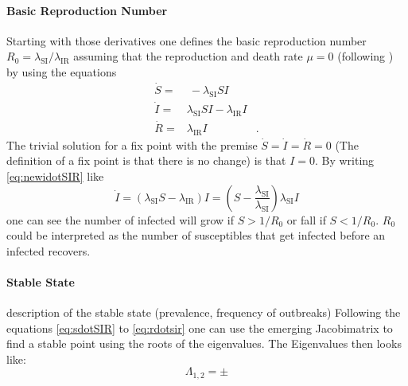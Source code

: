 \paragraph{Basic Reproduction Number}
Starting with those derivatives one defines the basic reproduction number $R_0=\lambda_\text{SI} / \lambda_\text{IR}$ assuming that the reproduction and death rate $\mu=0$ (following \citep{AND92}) by using the equations
\begin{eqnarray}
\dot{S} =& \ -\lambda_\text{SI} SI &  \label{eq:newsdotSIR}\\ 
\dot{I} =& \lambda_\text{SI} SI - \lambda_\text{IR} I  & \label{eq:newidotSIR}\\
\dot{R} =& \lambda_\text{IR} I &.
\end{eqnarray}
The trivial solution for a fix point with the premise $\dot{S} = \dot{I} =\dot{R} = 0$ (The definition of a fix point is that there is no change) is that $I=0$. By writing \ref{eq:newidotSIR} like 
\begin{equation}
\dot{I} = (\lambda_\text{SI} S -\lambda_\text{IR}) I = \left( S-\frac{\lambda_\text{SI}}{\lambda_\text{SI}} \right) \lambda_\text{SI} I
\end{equation}
one can see the number of infected will grow if $S > 1/R_0$ or fall if $S < 1/R_0$. $R_0$ could be interpreted as the number of susceptibles that get infected before an infected recovers.
\paragraph{Stable State}
description of the stable state (prevalence, frequency of outbreaks)
Following the equations \ref{eq:sdotSIR} to \ref{eq:rdotsir} one can use the emerging Jacobimatrix to find a stable point using the roots of the eigenvalues. The Eigenvalues then looks like:
\begin{equation}
\Lambda_{1,2} = \pm 
\end{equation}
